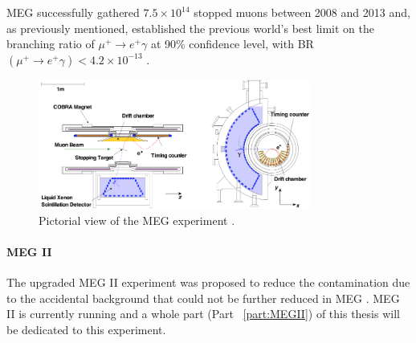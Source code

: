 \begin{refsection}
        \noindent
        MEG successfully gathered $7.5\times10^{14}$ stopped muons between 2008 and 2013 and, as previously mentioned, established the previous world's best limit on the branching ratio of $\mu^+\rightarrow e^+\gamma$ at 90\% confidence level, with BR$(\mu^+\rightarrow e^+\gamma)<4.2\times10^{-13}$ \cite{MEG}.

        \begin{figure}[h!]
            \centering
            \includegraphics[width=0.8\textwidth]{Figures/Introduction/MEG.png}
            \caption[cLFV: MEG experiment]{Pictorial view of the MEG experiment \cite{Chiappini}\cite{MEG}.}
            \label{_MEG}
        \end{figure}

        \paragraph{MEG II} 
        The upgraded MEG II experiment was proposed to reduce the contamination due to the accidental background that could not be further reduced in MEG \cite{MEG_upgrade} \cite{MEG_II}.
        MEG II is currently running and a whole part (Part ~\ref{part:MEGII}) of this thesis will be dedicated to this experiment.        
        

\end{refsection}
